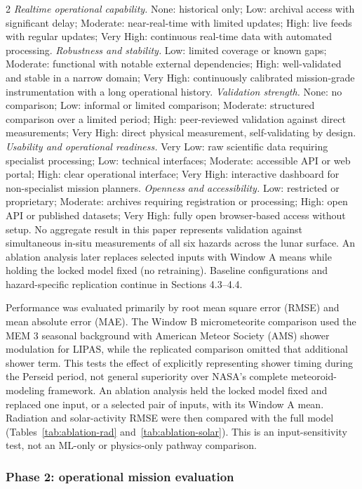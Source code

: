 \begin{multicols}{2}
\textit{Realtime operational capability.} None: historical only; Low: archival access with significant delay; Moderate: near-real-time with limited updates; High: live feeds with regular updates; Very High: continuous real-time data with automated processing. 
\textit{Robustness and stability.} Low: limited coverage or known gaps; Moderate: functional with notable external dependencies; High: well-validated and stable in a narrow domain; Very High: continuously calibrated mission-grade instrumentation with a long operational history. 
\textit{Validation strength.} None: no comparison; Low: informal or limited comparison; Moderate: structured comparison over a limited period; High: peer-reviewed validation against direct measurements; Very High: direct physical measurement, self-validating by design. 
\textit{Usability and operational readiness.} Very Low: raw scientific data requiring specialist processing; Low: technical interfaces; Moderate: accessible API or web portal; High: clear operational interface; Very High: interactive dashboard for non-specialist mission planners. 
\textit{Openness and accessibility.} Low: restricted or proprietary; Moderate: archives requiring registration or processing; High: open API or published datasets; Very High: fully open browser-based access without setup. No aggregate result in this paper represents validation against simultaneous in-situ measurements of all six hazards across the lunar surface. An ablation analysis later replaces selected inputs with Window A means while holding the locked model fixed (no retraining). Baseline configurations and hazard-specific replication continue in Sections 4.3--4.4.

Performance was evaluated primarily by root mean square error (RMSE) and mean absolute error (MAE). The Window B micrometeorite comparison used the MEM 3 seasonal background with American Meteor Society (AMS) shower modulation for LIPAS, while the replicated comparison omitted that additional shower term. This tests the effect of explicitly representing shower timing during the Perseid period, not general superiority over NASA's complete meteoroid-modeling framework. An ablation analysis held the locked model fixed and replaced one input, or a selected pair of inputs, with its Window A mean. Radiation and solar-activity RMSE were then compared with the full model (Tables~\ref{tab:ablation-rad} and~\ref{tab:ablation-solar}). This is an input-sensitivity test, not an ML-only or physics-only pathway comparison.

\subsubsection{Phase 2: operational mission evaluation}


\end{multicols}
